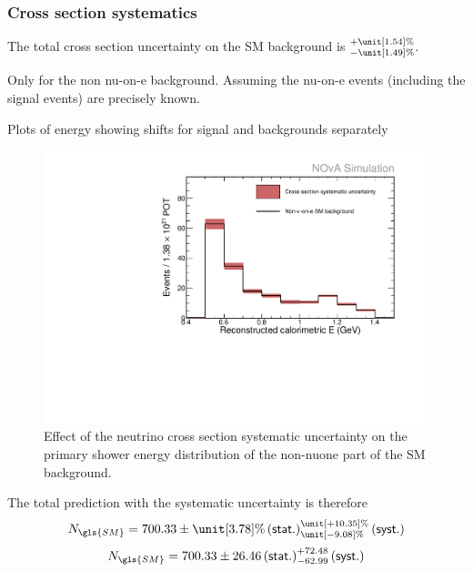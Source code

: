 \subsubsection*{Cross section systematics}

The total cross section uncertainty on the SM background is $^{+\unit[1.54]{\%}}_{-\unit[1.49]{\%}}$.

Only for the non nu-on-e background. Assuming the nu-on-e events (including the signal events) are precisely known.

Plots of energy showing shifts for signal and backgrounds separately

\begin{figure}[hbtp]
\centering
\includegraphics[width=.9\textwidth]{Plots/NuMM/SystShifts_xsecSysts_Full_Graph.pdf}
\caption[Neutrino cross section systematic uncertainty]{Effect of the neutrino cross section systematic uncertainty on the primary shower energy distribution of the non-\acrshort{nuone} part of the \acrshort{SM} background.}
\label{fig:NuMMXSecSysts}
\end{figure}


The total prediction with the systematic uncertainty is therefore
\begin{equation}
N_{\gls{SM}}=700.33 \pm \unit[3.78]{\%}\left(\textsf{stat.}\right) ^{\unit[+10.35]{\%}}_{\unit[-9.08]{\%}}\left(\textsf{syst.}\right)
\end{equation}
\begin{equation}
N_{\gls{SM}}=700.33 \pm 26.46\left(\textsf{stat.}\right) ^{+72.48}_{-62.99}\left(\textsf{syst.}\right)
\end{equation}

